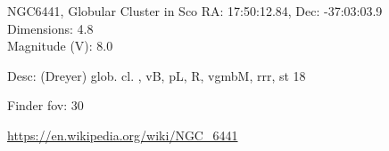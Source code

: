 \begin{block}{NGC6441, Globular Cluster in Sco}
    RA: 17:50:12.84, Dec: -37:03:03.9 \\ 
    Dimensions: 4.8 \\ 
    Magnitude (V): 8.0


    Desc: (Dreyer) glob. cl. , vB, pL, R, vgmbM, rrr, st 18 

    Finder fov: 30 

    \url{https://en.wikipedia.org/wiki/NGC_6441} 
\end{block}